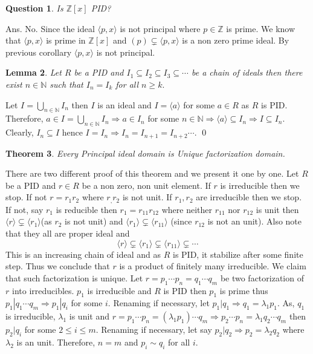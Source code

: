 \documentclass[11pt]{amsart}
\newtheorem{theorem}{Theorem}[section]
\newtheorem{qns}[theorem]{Question}
\newtheorem{lemma}[theorem]{Lemma}%
\newcommand{\ZZ}{\mathbb Z}
\newcommand{\NN}{\mathbb N}
\newcommand{\gen}[1]{\langle#1\rangle}
\begin{document}
\begin{qns}
Is ${\ZZ}[x]$ PID?
\end{qns}
Ans. No. Since the ideal $\gen{p,x}$ is not principal where $p\in {\ZZ}$ is prime. We know that $\gen{p,x}$ is prime in ${\ZZ}[x]$ and $(p)\subsetneq \gen{p,x}$ is a non zero prime ideal. By previous corollary $\gen{p,x}$ is not principal.

\begin{lemma}

Let $R$ be a PID and $I_1\subseteq I_2\subseteq I_3\subseteq \cdots $ be a chain of ideals then there exist $n\in {\NN}$ such that $I_n=I_k$ for all $n\geq k.$

\end{lemma}

\proof Let $I=\displaystyle\bigcup_{n\in {\NN}} I_n$ then $I$ is an ideal and $I=\gen{a}$ for some $a\in R$ as $R$ is PID. Therefore, $a\in I=\displaystyle\bigcup_{n\in {\NN}} I_n \Rightarrow a\in I_n$ for some $n\in {\NN} \Rightarrow \gen{a}\subseteq I_n \Rightarrow I\subseteq I_n.$ Clearly, $I_n\subseteq I$ hence $I=I_n \Rightarrow I_n=I_{n+1}=I_{n+2}\cdots $. \qed

\begin{theorem}

Every Principal ideal domain is Unique factorization domain.

\end{theorem}

\proof There are two different proof of this theorem and we present it one by one.
Let $R$ be a PID and $r\in R$ be a non zero, non unit element. If $r$ is irreducible then we stop. If not $r=r_1r_2$ where $r_,r_2$ is not unit. If $r_1,r_2$ are irreducible then we stop. If not, say $r_1$ is reducible then $r_1=r_{11}r_{12}$ where neither $r_{11}$ nor $r_{12}$ is unit then $\gen{r}\subsetneq \gen{r_1}$(as $r_2$ is not unit) and $\gen{r_1}\subsetneq \gen{r_{11}}$ (since $r_{12}$ is not an unit). Also note that they all are proper ideal and $$\gen{r}\subsetneq \gen{r_1}\subsetneq \gen{r_{11}}\subsetneq \cdots $$
This is an increasing chain of ideal and as $R$ is PID, it stabilize after some finite step. Thus we conclude that $r$ is a product of finitely many irreducible. We claim that such factorization is unique. Let $r=p_1\cdots p_n=q_1\cdots q_m$ be two factorization of $r$ into irreducibles. $p_1$ is irreducible and $R$ is PID then $p_1$ is prime thus $p_1|q_1\cdots q_m \Rightarrow p_1|q_i$ for some $i$. Renaming if necessary, let $p_1|q_1 \Rightarrow q_1=\lambda _1 p_1.$ As, $q_1$ is irreducible, $\lambda _1$ is unit and $r=p_1\cdots p_n=(\lambda _1p_1)\cdots q_m \Rightarrow p_2\cdots p_n=\lambda _1q_2\cdots q_m$ then $p_2|q_i$ for some $2\leq i\leq m$. Renaming if necessary, let say $p_2|q_2 \Rightarrow p_2=\lambda _2q_2$ where $\lambda _2$ is an unit. Therefore, $n=m$ and $p_i\sim q_i$ for all $i.$
\end{document}
